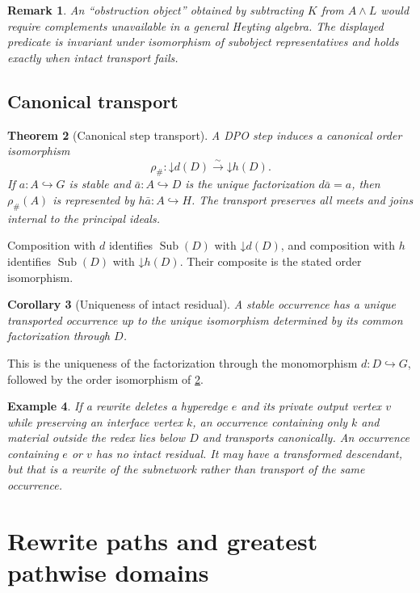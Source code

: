 \documentclass[12pt,a4paper,twoside]{extarticle}
\makeatletter
\theoremstyle{compactplain}
\newtheorem{theorem}{Theorem}[section]
\newtheorem{corollary}[theorem]{Corollary}
\theoremstyle{compactdef}
\newtheorem{example}[theorem]{Example}
\newtheorem{remark}[theorem]{Remark}
\renewenvironment{proof}[1][\proofname]{\par\pushQED{\qed}\normalfont
  \topsep2pt\trivlist\item[\hskip\labelsep\bfseries #1\@addpunct{.}]\ignorespaces}
 {\popQED\endtrivlist\@endpefalse}
\newcommand{\Sub}{\operatorname{Sub}}
\newcommand{\down}{\mathord{\downarrow}}
\newcommand{\mono}{\hookrightarrow}
\makeatother
\begin{document}
\begin{remark}
An ``obstruction object'' obtained by subtracting $K$ from $A\wedge L$ would require complements unavailable in a general Heyting algebra.  The displayed predicate is invariant under isomorphism of subobject representatives and holds exactly when intact transport fails.
\end{remark}

\subsection{Canonical transport}
\begin{theorem}[Canonical step transport]\label{thm:canonical-step}
A DPO step induces a canonical order isomorphism
\[
\rho_{\#}:\down d(D)\xrightarrow{\sim}\down h(D).
\]
If $a:A\mono G$ is stable and $\bar a:A\mono D$ is the unique factorization $d\bar a=a$, then $\rho_{\#}(A)$ is represented by $h\bar a:A\mono H$. The transport preserves all meets and joins internal to the principal ideals.
\end{theorem}
\begin{proof}
Composition with $d$ identifies $\Sub(D)$ with $\down d(D)$, and composition with $h$ identifies $\Sub(D)$ with $\down h(D)$. Their composite is the stated order isomorphism.
\end{proof}

\begin{corollary}[Uniqueness of intact residual]
A stable occurrence has a unique transported occurrence up to the unique isomorphism determined by its common factorization through $D$.
\end{corollary}
\begin{proof}
This is the uniqueness of the factorization through the monomorphism $d:D\mono G$, followed by the order isomorphism of \cref{thm:canonical-step}.
\end{proof}

\begin{example}
If a rewrite deletes a hyperedge $e$ and its private output vertex $v$ while preserving an interface vertex $k$, an occurrence containing only $k$ and material outside the redex lies below $D$ and transports canonically. An occurrence containing $e$ or $v$ has no intact residual. It may have a transformed descendant, but that is a rewrite of the subnetwork rather than transport of the same occurrence.
\end{example}
\section{Rewrite paths and greatest pathwise domains}
\end{document}
